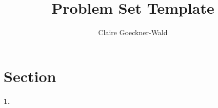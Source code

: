 \documentclass[10pt,letter]{article}
\begin{document}
\title{Problem Set Template}
\author{Claire Goeckner-Wald}
\maketitle 

\section*{Section}

\paragraph{1.} 
\end{document}
